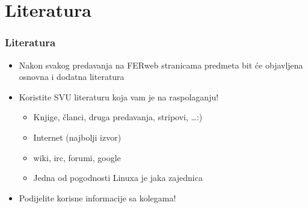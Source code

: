 \documentclass{beamer}
\begin{document}
\section{Literatura}
\begin{frame}[t]
\frametitle{Literatura}
\begin{itemize}
	\item Nakon svakog predavanja na FERweb stranicama predmeta bit će objavljena osnovna i dodatna literatura
	\item Koristite SVU literaturu koja vam je na raspolaganju!
	\begin{itemize}
		\item Knjige, članci, druga predavanja, stripovi, \ldots :)
		\item Internet (najbolji izvor)
		\item wiki, irc, forumi, google 
		\item Jedna od pogodnosti Linuxa je jaka zajednica
	\end{itemize}
	\item Podijelite korisne informacije sa kolegama!
\end{itemize}
\end{frame}
\end{document}

